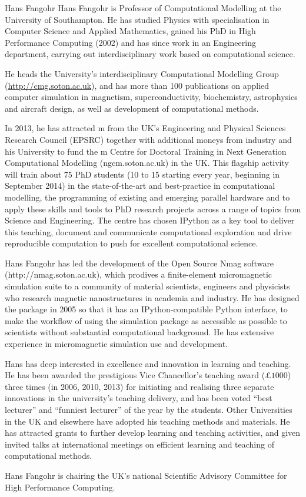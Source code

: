 \begin{participant}{Hans Fangohr}
  Hans Fangohr is Professor of Computational Modelling at the University of
  Southampton. He has studied Physics with specialisation in Computer Science and Applied
  Mathematics, gained his PhD in High Performance Computing (2002) and has since work in
  an Engineering department, carrying out interdisciplinary work based on computational
  science.

  He heads the University's interdisciplinary Computational Modelling Group
  (\url{http://cmg.soton.ac.uk}), and has more than 100 publications on applied computer
  simulation in magnetism, superconductivity, biochemistry, astrophysics and aircraft
  design, as well as development of computational methods.


  In 2013, he has attracted m from the UK's Engineering and Physical Sciences
  Research Council (EPSRC) together with additional moneys from industry and his
  University to fund the m Centre for Doctoral Training in Next Generation
  Computational Modelling (ngcm.soton.ac.uk) in the UK. This flagship activity will train
  about 75 PhD students (10 to 15 starting every year, beginning in September 2014) in the
  state-of-the-art and best-practice in computational modelling, the programming of
  existing and emerging parallel hardware and to apply these skills and tools to PhD
  research projects across a range of topics from Science and Engineering. The centre has
  chosen IPython as a key tool to deliver this teaching, document and communicate
  computational exploration and drive reproducible computation to push for excellent
  computational science.

  Hans Fangohr has led the development of the Open Source Nmag software
  (http://nmag.soton.ac.uk), which prodives a finite-element micromagnetic simulation
  suite to a community of material scientists, engineers and physicists who research
  magnetic nanostructures in academia and industry. He has designed the package in 2005 so
  that it has an IPython-compatible Python interface, to make the workflow of using the
  simulation package as accessible as possible to scientists without substantial
  computational background. He has extensive experience in micromagnetic simulation use
  and development.

  Hans has deep interested in excellence and innovation in learning and teaching. He has
  been awarded the prestigious Vice Chancellor’s teaching award ($\pounds 1000$) three
  times (in 2006, 2010, 2013) for initiating and realising three separate innovations in
  the university's teaching delivery, and has been voted ``best lecturer'' and ``funniest
  lecturer'' of the year by the students. Other Universities in the UK and elsewhere have
  adopted his teaching methods and materials. He has attracted grants to further develop
  learning and teaching activities, and given invited talks at international meetings on
  efficient learning and teaching of computational methods.
 
  Hans Fangohr is chairing the UK's national Scientific Advisory Committee for High
  Performance Computing.
\end{participant}


